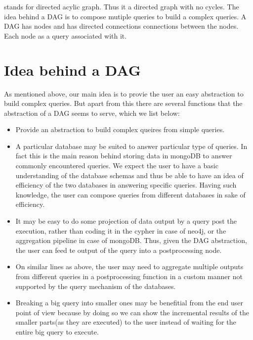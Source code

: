 \documentclass[letterpaper,10pt,english]{sphinxmanual}
\begin{document}
 stands for directed acylic graph. Thus it a directed graph with no cycles. The idea behind a DAG is to compose mutiple queries to build a complex queries. A DAG has nodes and has directed connections connections between the nodes. Each node as a query associated with it.


\section{Idea behind a DAG}
\label{\detokenize{dag:idea-behind-a-dag}}
As mentioned above, our main idea is to provie the user an easy abstraction to build complex queries. But apart from this there are several functions that the abstraction of a DAG seems to serve, which we list below:
\begin{itemize}
\item {} 
Provide an abstraction to build complex queires from simple queries.

\item {} 
A particular database may be suited to answer particular type of queries. In fact this is the main reason behind storing data in mongoDB to answer commonly encountered queries. We expect the user to have a basic understanding of the database schemas and thus be able to have an idea of efficiency of the two databases in answering specific queries. Having such knowledge, the user can compose queries from different databases in sake of efficiency.

\item {} 
It may be easy to do some projection of data output by a query post the execution, rather than coding it in the cypher in case of neo4j, or the aggregation pipeline in case of mongoDB. Thus, given the DAG abstraction, the user can feed te output of the query into a postprocessing node.

\item {} 
On similar lines as above, the user may need to aggregate multiple outputs from different queries in a postprocessing function in a custom manner not supported by the query mechanism of the databases.

\item {} 
Breaking a big query into smaller ones may be benefitial from the end user point of view because by doing so we can show the incremental results of the smaller parts(as they are executed) to the user instead of waiting for the entire big query to execute.

\end{itemize}
\end{document}
